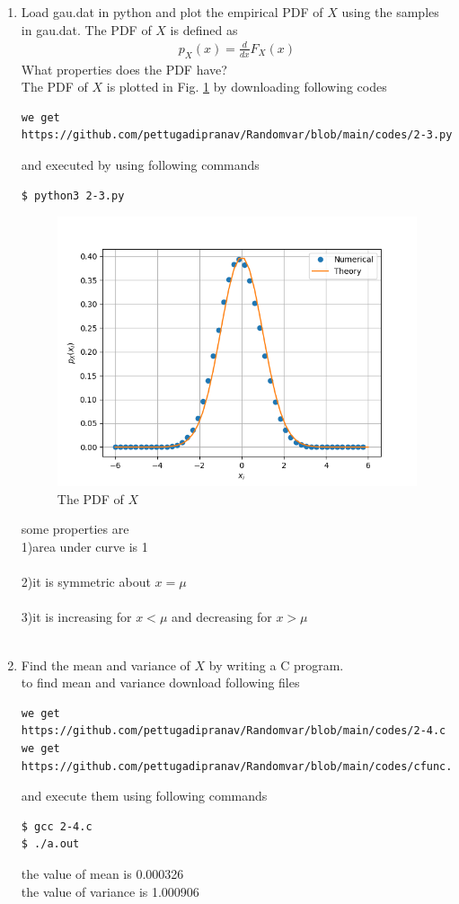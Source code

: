 \documentclass[journal,12pt,twocolumn]{IEEEtran}
\renewcommand\thesection{\arabic{section}}
\begin{document}
\begin{enumerate}[label=\thesection.\arabic*
,ref=\thesection.\theenumi]
\item
Load gau.dat in python and plot the empirical PDF of $X$ using the samples in gau.dat. The PDF of $X$ is defined as
\begin{align}
p_{X}(x) = \frac{d}{dx}F_{X}(x)
\end{align}
What properties does the PDF have?
\\
\solution The PDF of $X$ is plotted in Fig. \ref{fig:gauss_pdf} by downloading following codes
\begin{lstlisting}
we get https://github.com/pettugadipranav/Randomvar/blob/main/codes/2-3.py
\end{lstlisting}
and executed by using following commands
\begin{lstlisting}
$ python3 2-3.py
\end{lstlisting}
\begin{figure}[!h]
\centering
\includegraphics[width=\columnwidth]{./figs/2-3}
\caption{The PDF of $X$}
\label{fig:gauss_pdf}
\end{figure} 
some properties are\\
1)area under curve is 1\\ \\
2)it is symmetric about $x=\mu$\\ \\ 
3)it is increasing for $x<\mu$ and decreasing for $x>\mu$
\\ \\
\item Find the mean and variance of $X$ by writing a C program.\\
\solution to find mean and variance download following files
\begin{lstlisting}
we get https://github.com/pettugadipranav/Randomvar/blob/main/codes/2-4.c
we get https://github.com/pettugadipranav/Randomvar/blob/main/codes/cfunc.h
\end{lstlisting}
and execute them using following commands
\begin{lstlisting}
$ gcc 2-4.c
$ ./a.out
\end{lstlisting}
the value of mean is 0.000326\\
the value of variance is 1.000906\\


\end{enumerate}
\end{document}
